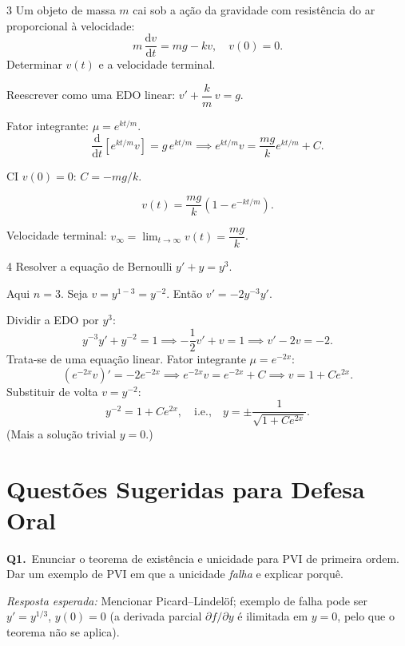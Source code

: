 \documentclass[12pt, a4paper]{article}
\newcommand{\dd}{\mathrm{d}}
\begin{document}
\begin{exercisebox}{3}
  Um objeto de massa $m$ cai sob a ação da gravidade com resistência do ar proporcional à
  velocidade:
  \[
    m\,\frac{\dd v}{\dd t} = mg - kv, \quad v(0)=0.
  \]
  Determinar $v(t)$ e a velocidade terminal.
\end{exercisebox}

\begin{solbox}
  Reescrever como uma EDO linear: $v' + \dfrac{k}{m}\,v = g$.

  Fator integrante: $\mu = e^{kt/m}$.
  \[
    \frac{\dd}{\dd t}\!\left[e^{kt/m}v\right] = g\,e^{kt/m}
    \implies e^{kt/m}v = \frac{mg}{k}e^{kt/m} + C.
  \]

  CI $v(0)=0$: $C = -mg/k$.

  \[
    \boxed{v(t) = \frac{mg}{k}\!\left(1-e^{-kt/m}\right).}
  \]

  Velocidade terminal: $v_{\infty} = \lim_{t\to\infty} v(t) = \dfrac{mg}{k}$.
\end{solbox}

\begin{exercisebox}{4}
  Resolver a equação de Bernoulli $y' + y = y^3$.
\end{exercisebox}

\begin{solbox}
  Aqui $n=3$. Seja $v = y^{1-3} = y^{-2}$. Então $v' = -2y^{-3}y'$.

  Dividir a EDO por $y^3$:
  \[
    y^{-3}y' + y^{-2} = 1
    \implies -\frac{1}{2}v' + v = 1
    \implies v' - 2v = -2.
  \]
  Trata-se de uma equação linear. Fator integrante $\mu = e^{-2x}$:
  \[
    \left(e^{-2x}v\right)' = -2e^{-2x}
    \implies e^{-2x}v = e^{-2x} + C
    \implies v = 1 + Ce^{2x}.
  \]
  Substituir de volta $v=y^{-2}$:
  \[
    \boxed{y^{-2} = 1 + Ce^{2x}, \quad \text{i.e.,}\quad
           y = \pm\frac{1}{\sqrt{1+Ce^{2x}}}.}
  \]
  (Mais a solução trivial $y=0$.)
\end{solbox}

\section{Questões Sugeridas para Defesa Oral}
\label{sec:oral}

\begin{oralbox}
  \textbf{Q1.}\ Enunciar o teorema de existência e unicidade para PVI de primeira ordem.
  Dar um exemplo de PVI em que a unicidade \emph{falha} e explicar porquê.

  \medskip
  \textit{Resposta esperada:} Mencionar Picard--Lindel\"of; exemplo de falha pode ser
  $y' = y^{1/3}$, $y(0)=0$ (a derivada parcial $\partial f/\partial y$ é ilimitada
  em $y=0$, pelo que o teorema não se aplica).
\end{oralbox}
\end{document}
